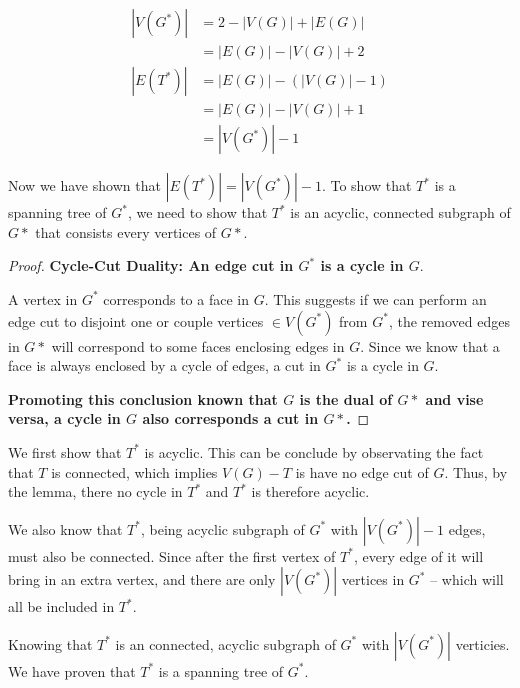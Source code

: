 \documentclass[11pt]{article}
\begin{document}
\begin{align*}
    |V(G^*)| &= 2 - |V(G)| + |E(G)| \\
    &= |E(G)|- |V(G)| + 2 \\
    |E(T^*)| &= |E(G)| - (|V(G)| - 1) \\
    &= |E(G)| - |V(G)| + 1 \\
    &= |V(G^*)| - 1
\end{align*}

Now we have shown that $|E(T^*)| = |V(G^*)| - 1$. To show that $T^*$ is a spanning tree of $G^*$, we need to show that $T^*$ is an acyclic, connected subgraph of $G*$ that consists every vertices of $G*$.

\leavevmode\newline


    \begin{adjustwidth}{1cm}{}

    \begin{proof}
    \textbf{Cycle-Cut Duality: An edge cut in $G^*$ is a cycle in $G$}.\newline

    A vertex in $G^*$ corresponds to a face in $G$. This suggests if we can perform an edge cut to disjoint one or couple vertices $\in V(G^*)$ from $G^*$, the removed edges in $G*$ will correspond to some faces enclosing edges in $G$. Since we know that a face is always enclosed by a cycle of edges, a cut in $G^*$ is a cycle in $G$.

    \textbf{Promoting this conclusion known that $G$ is the dual of $G*$ and vise versa, a cycle in $G$ also corresponds a cut in $G*$.}


    \end{proof}

    \end{adjustwidth}

We first show that $T^*$ is acyclic. This can be conclude by observating the fact that $T$ is connected, which implies $V(G) - T$ is have no edge cut of $G$. Thus, by the lemma, there no cycle in $T^*$ and $T^*$ is therefore acyclic.

We also know that $T^*$, being acyclic subgraph of $G^*$ with $|V(G^*)| - 1$ edges, must also be connected. Since after the first vertex of $T^*$, every edge of it will bring in an extra vertex, and there are only $|V(G^*)|$ vertices in $G^*$ -- which will all be included in $T^*$.\newline

Knowing that $T^*$ is an connected, acyclic subgraph of $G^*$ with $|V(G^*)|$ verticies. We have proven that $T^*$ is a spanning tree of $G^*$.
\end{document}
